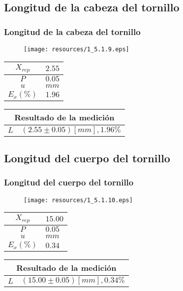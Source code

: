 \documentclass[letter,11pt]{beamer}
\begin{document}
\subsection{Longitud de la cabeza del tornillo}
\begin{frame}
\frametitle{Longitud de la cabeza del tornillo}
\vspace*{0.8cm}
\begin{figure}
\centering
\texttt{[image: resources/1\_5.1.9.eps]}
\end{figure}
\vspace*{0.4cm}
\scriptsize
\begin{tabular}{|c|>{\centering}m{1.8cm}<{\centering}|}
\hline
$X_{rep}$ &   $2.55$ \tabularnewline \hline
      $P$ &   $0.05$ \tabularnewline \hline
      $u$ &     $mm$ \tabularnewline \hline
$E_x(\%)$ &   $1.96$ \tabularnewline \hline
\end{tabular}
\quad
\begin{tabular}{|c|>{\centering}m{5.7cm}<{\centering}|}
\hline
\multicolumn{2}{|c|}{\textbf{Resultado de la medición}} \\ \hline
$L$ & $( 2.55\pm0.05)[mm], 1.96\%$ \tabularnewline \hline
\end{tabular}
\end{frame}

\subsection{Longitud del cuerpo del tornillo}
\begin{frame}
\frametitle{Longitud del cuerpo del tornillo}
\vspace*{0.8cm}
\begin{figure}
\centering
\texttt{[image: resources/1\_5.1.10.eps]}
\end{figure}
\vspace*{0.4cm}
\scriptsize
\begin{tabular}{|c|>{\centering}m{1.8cm}<{\centering}|}
\hline
$X_{rep}$ &  $15.00$ \tabularnewline \hline
      $P$ &   $0.05$ \tabularnewline \hline
      $u$ &     $mm$ \tabularnewline \hline
$E_x(\%)$ &   $0.34$ \tabularnewline \hline
\end{tabular}
\quad
\begin{tabular}{|c|>{\centering}m{5.7cm}<{\centering}|}
\hline
\multicolumn{2}{|c|}{\textbf{Resultado de la medición}} \\ \hline
$L$ & $( 15.00\pm0.05)[mm], 0.34\%$ \tabularnewline \hline
\end{tabular}
\end{frame}
\end{document}
